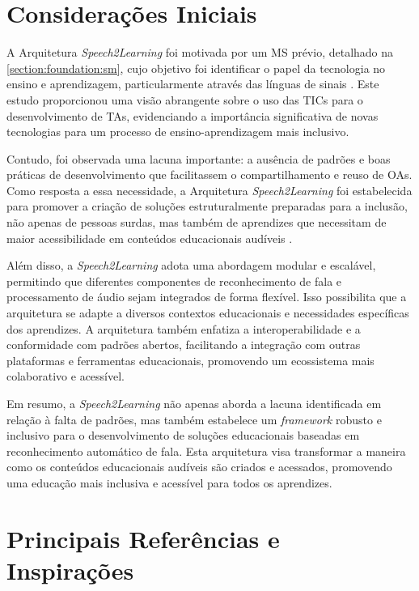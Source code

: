 \section{Considerações Iniciais}

A Arquitetura \textit{Speech2Learning} foi motivada por um MS prévio, detalhado na \autoref{section:foundation:sm}, cujo objetivo foi identificar o papel da tecnologia no ensino e aprendizagem, particularmente através das línguas de sinais \cite{FalvoJr2020_SBIE, FalvoJr2020_FIE, FalvoJr2021_RENOTE}. Este estudo proporcionou uma visão abrangente sobre o uso das TICs para o desenvolvimento de TAs, evidenciando a importância significativa de novas tecnologias para um processo de ensino-aprendizagem mais inclusivo.

Contudo, foi observada uma lacuna importante: a ausência de padrões e boas práticas de desenvolvimento que facilitassem o compartilhamento e reuso de OAs. Como resposta a essa necessidade, a Arquitetura \textit{Speech2Learning} foi estabelecida para promover a criação de soluções estruturalmente preparadas para a inclusão, não apenas de pessoas surdas, mas também de aprendizes que necessitam de maior acessibilidade em conteúdos educacionais audíveis \cite{FalvoJr2023_HICSS}.

Além disso, a \textit{Speech2Learning} adota uma abordagem modular e escalável, permitindo que diferentes componentes de reconhecimento de fala e processamento de áudio sejam integrados de forma flexível. Isso possibilita que a arquitetura se adapte a diversos contextos educacionais e necessidades específicas dos aprendizes. A arquitetura também enfatiza a interoperabilidade e a conformidade com padrões abertos, facilitando a integração com outras plataformas e ferramentas educacionais, promovendo um ecossistema mais colaborativo e acessível.

Em resumo, a \textit{Speech2Learning} não apenas aborda a lacuna identificada em relação à falta de padrões, mas também estabelece um \textit{framework} robusto e inclusivo para o desenvolvimento de soluções educacionais baseadas em reconhecimento automático de fala. Esta arquitetura visa transformar a maneira como os conteúdos educacionais audíveis são criados e acessados, promovendo uma educação mais inclusiva e acessível para todos os aprendizes.

\section{Principais Referências e Inspirações}


